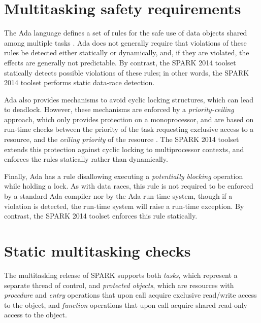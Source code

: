 \documentclass[conference,compsoc]{IEEEtran}
\begin{document}
\section{Multitasking safety requirements}
The Ada language defines a set of rules for the safe use of data objects
shared among multiple tasks \cite{lrm}. Ada does not generally require that
violations of these rules be detected either statically or dynamically,
and, if they are violated, the effects are generally not predictable. By
contrast, the SPARK 2014 toolset statically detects possible violations of
these rules; in other words, the SPARK 2014 toolset performs static
data-race detection.

Ada also provides mechanisms to avoid cyclic locking structures, which can
lead to deadlock. However, these mechanisms are enforced by a
\emph{priority-ceiling} approach, which only provides protection on a
monoprocessor, and are based on run-time checks between the priority of the
task requesting exclusive access to a resource, and the \emph{ceiling
  priority} of the resource \cite{mccormick2011building}. The SPARK 2014
toolset extends this protection against cyclic locking to multiprocessor
contexts, and enforces the rules statically rather than dynamically.

Finally, Ada has a rule disallowing executing a \emph{potentially blocking}
operation while holding a lock. As with data races, this rule is not
required to be enforced by a standard Ada compiler nor by the Ada run-time
system, though if a violation is detected, the run-time system will raise a
run-time exception. By contrast, the SPARK 2014 toolset enforces this rule
statically.

\section{Static multitasking checks}
The multitasking release of SPARK supports both \emph{tasks}, which
represent a separate thread of control, and \emph{protected objects}, which
are resources with \emph{procedure} and \emph{entry} operations that upon
call acquire exclusive read/write access to the object, and \emph{function}
operations that upon call acquire shared read-only access to the object.
\end{document}
